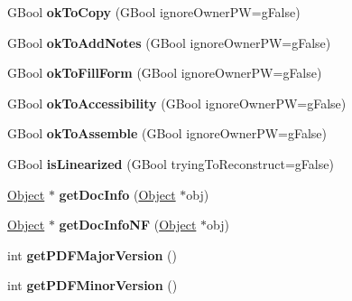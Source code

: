 \begin{DoxyCompactItemize}
\mbox{\label{class_p_d_f_doc_adcedcc13ec30109ea4be6a6726be7a5a}} 
G\+Bool {\bfseries ok\+To\+Copy} (G\+Bool ignore\+Owner\+PW=g\+False)
\item 
\mbox{\label{class_p_d_f_doc_ac7ee1992d386206c5f23b736701179e5}} 
G\+Bool {\bfseries ok\+To\+Add\+Notes} (G\+Bool ignore\+Owner\+PW=g\+False)
\item 
\mbox{\label{class_p_d_f_doc_ad843ddf960e3683b799018f15784834d}} 
G\+Bool {\bfseries ok\+To\+Fill\+Form} (G\+Bool ignore\+Owner\+PW=g\+False)
\item 
\mbox{\label{class_p_d_f_doc_a1699b66f3685ecaf5ad833d1ba06338a}} 
G\+Bool {\bfseries ok\+To\+Accessibility} (G\+Bool ignore\+Owner\+PW=g\+False)
\item 
\mbox{\label{class_p_d_f_doc_ac5948afaf5f4a76d49045a27f9fa1f72}} 
G\+Bool {\bfseries ok\+To\+Assemble} (G\+Bool ignore\+Owner\+PW=g\+False)
\item 
\mbox{\label{class_p_d_f_doc_ab2349dccbcc83099eb730d90beffaf80}} 
G\+Bool {\bfseries is\+Linearized} (G\+Bool trying\+To\+Reconstruct=g\+False)
\item 
\mbox{\label{class_p_d_f_doc_ad23ced41c484df1fe99a7c625ca6d7f1}} 
\hyperlink{class_object}{Object} $\ast$ {\bfseries get\+Doc\+Info} (\hyperlink{class_object}{Object} $\ast$obj)
\item 
\mbox{\label{class_p_d_f_doc_a90afadd7011667720cbe1646fb58eb17}} 
\hyperlink{class_object}{Object} $\ast$ {\bfseries get\+Doc\+Info\+NF} (\hyperlink{class_object}{Object} $\ast$obj)
\item 
\mbox{\label{class_p_d_f_doc_a76e3e29613a198d26cc818b264e2adf6}} 
int {\bfseries get\+P\+D\+F\+Major\+Version} ()
\item 
\mbox{\label{class_p_d_f_doc_a0c22532ab08321a96a766e5e05ddd390}} 
int {\bfseries get\+P\+D\+F\+Minor\+Version} ()
\item 
\mbox{\label{class_p_d_f_doc_a48c68b14a9817d93cb987a1dc5a72c70}} 

\end{DoxyCompactItemize}

